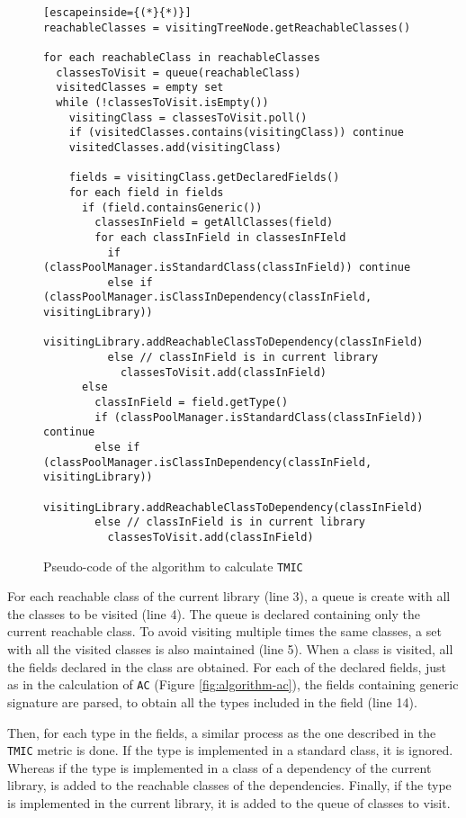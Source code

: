 \begin{figure}[ht!]
\begin{lstlisting}[escapeinside={(*}{*)}]
reachableClasses = visitingTreeNode.getReachableClasses()

for each reachableClass in reachableClasses
  classesToVisit = queue(reachableClass)
  visitedClasses = empty set
  while (!classesToVisit.isEmpty())
    visitingClass = classesToVisit.poll()
    if (visitedClasses.contains(visitingClass)) continue
    visitedClasses.add(visitingClass)

    fields = visitingClass.getDeclaredFields()
    for each field in fields
      if (field.containsGeneric())
        classesInField = getAllClasses(field)
        for each classInField in classesInFIeld
          if (classPoolManager.isStandardClass(classInField)) continue
          else if (classPoolManager.isClassInDependency(classInField, visitingLibrary))
            visitingLibrary.addReachableClassToDependency(classInField)
          else // classInField is in current library
            classesToVisit.add(classInField)
      else
        classInField = field.getType()
        if (classPoolManager.isStandardClass(classInField)) continue
        else if (classPoolManager.isClassInDependency(classInField, visitingLibrary))
          visitingLibrary.addReachableClassToDependency(classInField)
        else // classInField is in current library
          classesToVisit.add(classInField)
\end{lstlisting}
\caption{Pseudo-code of the algorithm to calculate \texttt{TMIC}}
\label{fig:calculate-tac}
\end{figure}

For each reachable class of the current library (line 3), a queue is create with all the classes to be visited (line 4). The queue is declared containing only the current reachable class. To avoid visiting multiple times the same classes, a set with all the visited classes is also maintained (line 5). When a class is visited, all the fields declared in the class are obtained. For each of the declared fields, just as in the calculation of \texttt{AC} (Figure \ref{fig:algorithm-ac}), the fields containing generic signature are parsed, to obtain all the types included in the field (line 14).

Then, for each type in the fields, a similar process as the one described in the \texttt{TMIC} metric is done. If the type is implemented in a standard class, it is ignored. Whereas if the type is implemented in a class of a dependency of the current library, is added to the reachable classes of the dependencies. Finally, if the type is implemented in the current library, it is added to the queue of classes to visit.

